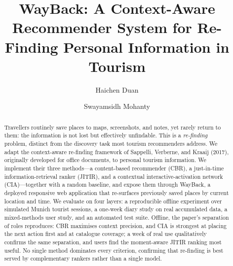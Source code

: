 \documentclass[acmlarge]{acmart}
\begin{document}
\title{WayBack: A Context-Aware Recommender System for Re-Finding Personal Information in Tourism}

\author{Haichen Duan}

\author{Swayamsidh Mohanty}

\renewcommand{\shortauthors}{Duan and Mohanty}

\begin{abstract}
Travellers routinely save places to maps, screenshots, and notes, yet
rarely return to them: the information is not lost but effectively
unfindable. This is a \emph{re-finding} problem, distinct from the
discovery task most tourism recommenders address. We adapt the
context-aware re-finding framework of Sappelli, Verberne, and Kraaij
(2017), originally developed for office documents, to personal tourism
information. We implement their three methods---a content-based
recommender (CBR), a just-in-time information-retrieval ranker (JITIR),
and a contextual interactive-activation network (CIA)---together with a
random baseline, and expose them through WayBack, a deployed responsive
web application that re-surfaces previously saved places by current
location and time. We evaluate on four layers: a reproducible offline
experiment over simulated Munich tourist sessions, a one-week diary study
on real accumulated data, a mixed-methods user study, and an automated
test suite. Offline, the paper's separation of roles reproduces: CBR maximises
context precision, and CIA is strongest at placing the next action first
and at catalogue coverage; a week of real use qualitatively confirms the
same separation, and users find the moment-aware JITIR ranking most
useful. No
single method dominates every criterion, confirming that
re-finding is best served by complementary rankers rather than a single
model.
\end{abstract}
\end{document}
